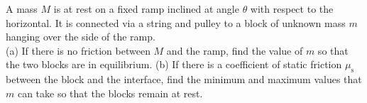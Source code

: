 A mass $M$ is at rest on a fixed ramp inclined at angle $\theta$ with
respect to the horizontal. It is connected via a string and pulley to
a block of unknown mass $m$ hanging over the side of the ramp.\\
%
(a) If there is no friction between $M$ and the ramp, find the
value of $m$ so that the two blocks are in equilibrium.\hwendpart
%
(b) If there is a coefficient of static friction $\mu_\text{s}$
between the block and the interface, find the minimum and maximum
values that $m$ can take so that the blocks remain at rest.
